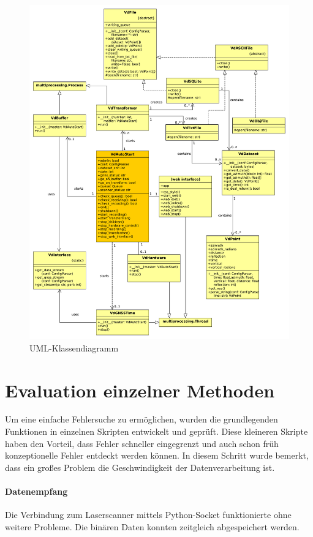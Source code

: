\documentclass[a4paper,12pt,bibliography=totoc, listof=totoc,titlepage,pointlessnumbers]{scrreprt}
\begin{document}
\begin{figure}
 \centering
 \includegraphics[width=1\textwidth]{./img/UML.pdf}
 \caption{UML-Klassendiagramm}
 \label{img:uml}
\end{figure}

\section{Evaluation einzelner Methoden}
Um eine einfache Fehlersuche zu ermöglichen, wurden die grundlegenden Funktionen in einzelnen Skripten entwickelt und geprüft. Diese kleineren Skripte haben den Vorteil, dass Fehler schneller eingegrenzt und auch schon früh konzeptionelle Fehler entdeckt werden können. In diesem Schritt wurde bemerkt, dass ein großes Problem die Geschwindigkeit der Datenverarbeitung ist. 

\paragraph{Datenempfang}
Die Verbindung zum Laser\-scan\-ner mittels Python-Socket funktionierte ohne weitere Probleme. Die binären Daten konnten zeitgleich abgespeichert werden.
\end{document}
